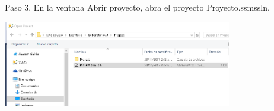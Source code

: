 \begin{flushleft}
\textbf{}\\
\textbf{}\\
\textbf{}\\
\textbf{}\\
\textbf{}\\
\textbf{}\\
\textbf{}\\
\textbf{}\\
\textbf{}\\
Paso 3. En la ventana Abrir proyecto, abra el proyecto Proyecto.ssmssln.
\begin{center}
	\includegraphics[width=10cm]{./Imagenes/img3} 
	\end{center}


\end{flushleft}

